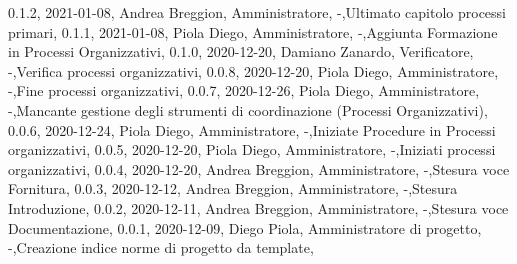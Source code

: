 {    {0.1.2, 2021-01-08, Andrea Breggion, Amministratore, -,Ultimato capitolo processi primari},
    {0.1.1, 2021-01-08, Piola Diego, Amministratore, -,Aggiunta Formazione in Processi Organizzativi},
    {0.1.0, 2020-12-20, Damiano Zanardo, Verificatore, -,Verifica processi organizzativi},
    {0.0.8, 2020-12-20, Piola Diego, Amministratore, -,Fine processi organizzativi},
    {0.0.7, 2020-12-26, Piola Diego, Amministratore, -,Mancante gestione degli strumenti di coordinazione (Processi Organizzativi)},
    {0.0.6, 2020-12-24, Piola Diego, Amministratore, -,Iniziate Procedure in Processi organizzativi},
    {0.0.5, 2020-12-20, Piola Diego, Amministratore, -,Iniziati processi organizzativi},
    {0.0.4, 2020-12-20, Andrea Breggion, Amministratore, -,Stesura voce Fornitura},
    {0.0.3, 2020-12-12, Andrea Breggion, Amministratore, -,Stesura Introduzione},
    {0.0.2, 2020-12-11, Andrea Breggion, Amministratore, -,Stesura voce Documentazione},
    {0.0.1, 2020-12-09, Diego Piola, Amministratore di progetto, -,Creazione indice norme di progetto da template},
}
